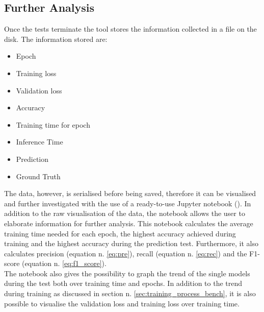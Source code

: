 \subsection{Further Analysis}
Once the tests terminate the tool stores the information collected in a file on the disk. The information stored are:
\begin{itemize}
\item Epoch
\item Training loss
\item Validation loss
\item Accuracy
\item Training time for epoch
\item Inference Time
\item Prediction
\item Ground Truth
\end{itemize}
The data, however, is serialised before being saved, therefore it can be visualised and further investigated with the use of a ready-to-use Jupyter notebook (\cite{Kluyver2016jupyter}). In addition to the raw visualisation of the data, the notebook allows the user to elaborate information for further analysis. This notebook calculates the average training time needed for each epoch, the highest accuracy achieved during training and the highest accuracy during the prediction test.  Furthermore, it also calculates precision (equation n. \ref{eq:pre}), recall (equation n. \ref{eq:rec}) and the F1-score (equation n. \ref{eq:f1_score}). \\
The notebook also gives the possibility to graph the trend of the single models during the test both over training time and epochs. In addition to the trend during training as discussed in section n. \ref{sec:training_process_bench}, it is also possible to visualise the validation loss and training loss over training time. 
